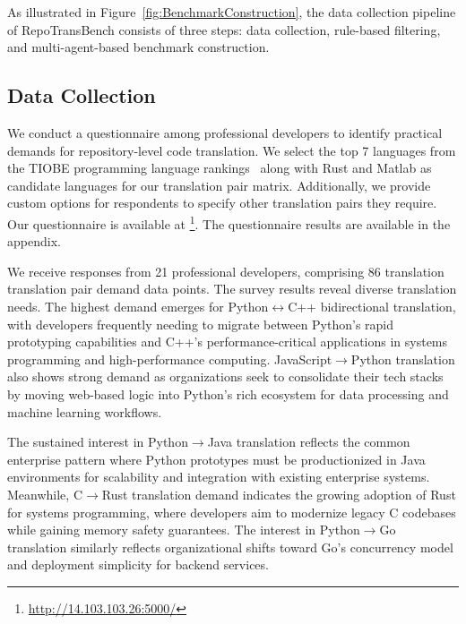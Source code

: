 As illustrated in Figure~\ref{fig:BenchmarkConstruction}, the data collection pipeline of RepoTransBench consists of three steps: data collection, rule-based filtering, and multi-agent-based benchmark construction.

\subsection{Data Collection}

We conduct a questionnaire among professional developers to identify practical demands for repository-level code translation. We select the top 7 languages from the TIOBE programming language rankings~\cite{TIOBE-Index} along with Rust and Matlab as candidate languages for our translation pair matrix. Additionally, we provide custom options for respondents to specify other translation pairs they require. Our questionnaire is available at \footnote{\url{http://14.103.103.26:5000/}}. The questionnaire results are available in the appendix.


We receive responses from 21 professional developers, comprising 86 translation translation pair demand data points. The survey results reveal diverse translation needs. The highest demand emerges for Python$\leftrightarrow$C++ bidirectional translation, with developers frequently needing to migrate between Python's rapid prototyping capabilities and C++'s performance-critical applications in systems programming and high-performance computing. JavaScript$\rightarrow$Python translation also shows strong demand as organizations seek to consolidate their tech stacks by moving web-based logic into Python's rich ecosystem for data processing and machine learning workflows.

The sustained interest in Python$\rightarrow$Java translation reflects the common enterprise pattern where Python prototypes must be productionized in Java environments for scalability and integration with existing enterprise systems. Meanwhile, C$\rightarrow$Rust translation demand indicates the growing adoption of Rust for systems programming, where developers aim to modernize legacy C codebases while gaining memory safety guarantees. The interest in Python$\rightarrow$Go translation similarly reflects organizational shifts toward Go's concurrency model and deployment simplicity for backend services.

